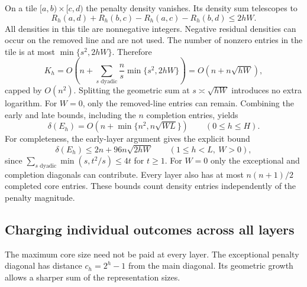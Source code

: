 \documentclass[11pt]{article}
\begin{document}
On a tile $[a,b)\times[c,d)$ the penalty density vanishes. Its density
sum telescopes to
\[
 R_h(a,d)+R_h(b,c)-R_h(a,c)-R_h(b,d)\le2hW.
\]
All densities in this tile are nonnegative integers. Negative residual
densities can occur on the removed line and are not used. The number
of nonzero entries in the tile is at most $\min\{s^2,2hW\}$. Therefore
\[
 K_h=O\!\left(n+\sum_{s\text{ dyadic}}\frac ns
                         \min\{s^2,2hW\}\right)
     =O(n+n\sqrt{hW}),
\]
capped by $O(n^2)$. Splitting the geometric sum at $s\asymp\sqrt{hW}$
introduces no extra logarithm. For $W=0$, only the removed-line entries
can remain. Combining the early and late bounds, including the $n$
completion entries, yields
\begin{equation}\label{eq:penalty-core-bound}
 \delta(E_h)=O\!\left(n+\min\{n^2,n\sqrt{WL}\}\right)
 \qquad(0\le h\le H).
\end{equation}
For completeness, the early-layer argument gives the explicit bound
\[
 \delta(E_h)\le 2n+96n\sqrt{2hW}\qquad(1\le h<L,\ W>0),
\]
since $\sum_{s\text{ dyadic}}\min(s,t^2/s)\le4t$ for $t\ge1$.
For $W=0$ only the exceptional and completion diagonals can contribute.
Every layer also has at most $n(n+1)/2$ completed core entries.
These bounds count density entries independently of the penalty magnitude.

\subsection{Charging individual outcomes across all layers}
\label{sec:aggregate-cores}
The maximum core size need not be paid at every layer. The exceptional
penalty diagonal has distance $c_h=2^h-1$ from the main diagonal. Its
geometric growth allows a sharper sum of the representation sizes.
\end{document}

